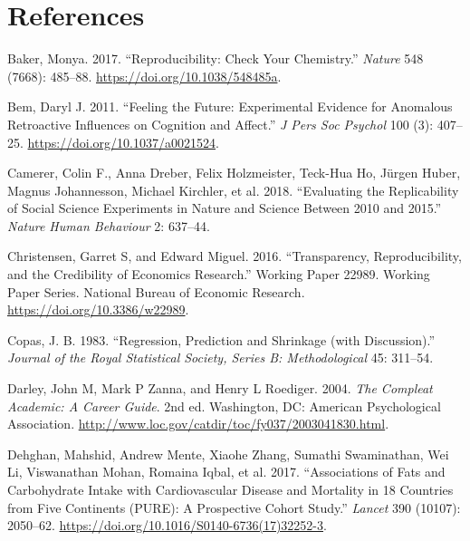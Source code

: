 \documentclass[
  12pt,
]{book}
\newlength{\cslhangindent}
\newlength{\cslentryspacingunit} %
\newenvironment{CSLReferences}[2] %
 {%
  \setlength{\parindent}{0pt}
  \ifodd #1
  \let\oldpar\par
  \def\par{\hangindent=\cslhangindent\oldpar}
  \fi
  \setlength{\parskip}{#2\cslentryspacingunit}
 }%
 {}
\begin{document}
\hypertarget{references}{%
\chapter{References}\label{references}}

\hypertarget{refs}{}
\begin{CSLReferences}{1}{0}
\leavevmode{}%
Baker, Monya. 2017. {``Reproducibility: Check Your Chemistry.''} \emph{Nature} 548 (7668): 485--88. \url{https://doi.org/10.1038/548485a}.

\leavevmode{}%
Bem, Daryl J. 2011. {``Feeling the Future: Experimental Evidence for Anomalous Retroactive Influences on Cognition and Affect.''} \emph{J Pers Soc Psychol} 100 (3): 407--25. \url{https://doi.org/10.1037/a0021524}.

\leavevmode{}%
Camerer, Colin F., Anna Dreber, Felix Holzmeister, Teck-Hua Ho, Jürgen Huber, Magnus Johannesson, Michael Kirchler, et al. 2018. {``Evaluating the Replicability of Social Science Experiments in Nature and Science Between 2010 and 2015.''} \emph{Nature Human Behaviour} 2: 637--44.

\leavevmode{}%
Christensen, Garret S, and Edward Miguel. 2016. {``Transparency, Reproducibility, and the Credibility of Economics Research.''} Working Paper 22989. Working Paper Series. National Bureau of Economic Research. \url{https://doi.org/10.3386/w22989}.

\leavevmode{}%
Copas, J. B. 1983. {``Regression, Prediction and Shrinkage (with Discussion).''} \emph{Journal of the Royal Statistical Society, Series B: Methodological} 45: 311--54.

\leavevmode{}%
Darley, John M, Mark P Zanna, and Henry L Roediger. 2004. \emph{The Compleat Academic: A Career Guide}. 2nd ed. Washington, DC: American Psychological Association. \url{http://www.loc.gov/catdir/toc/fy037/2003041830.html}.

\leavevmode{}%
Dehghan, Mahshid, Andrew Mente, Xiaohe Zhang, Sumathi Swaminathan, Wei Li, Viswanathan Mohan, Romaina Iqbal, et al. 2017. {``Associations of Fats and Carbohydrate Intake with Cardiovascular Disease and Mortality in 18 Countries from Five Continents (PURE): A Prospective Cohort Study.''} \emph{Lancet} 390 (10107): 2050--62. \url{https://doi.org/10.1016/S0140-6736(17)32252-3}.


\end{CSLReferences}
\end{document}
